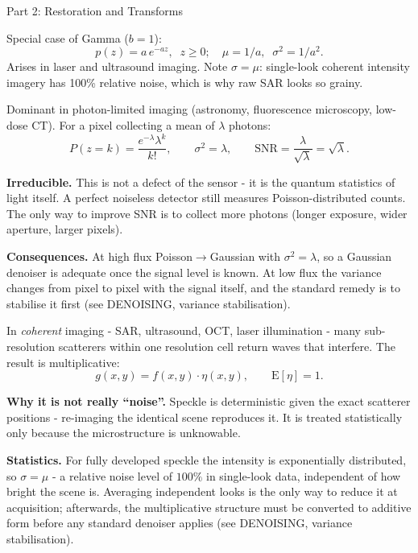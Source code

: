 \documentclass[letterpaper]{article}
\begin{document}
\begin{notes}{Part 2: Restoration and Transforms}

Special case of Gamma ($b=1$):
$$p(z) = a\,e^{-az},\;\;z\ge 0;\quad \mu=1/a,\;\;\sigma^2=1/a^2.$$
Arises in laser and ultrasound imaging. Note $\sigma = \mu$: single-look coherent intensity imagery has 100\% relative noise, which is why raw SAR looks so grainy.


Dominant in photon-limited imaging (astronomy, fluorescence microscopy, low-dose CT). For a pixel collecting a mean of $\lambda$ photons:
$$P(z=k)=\frac{e^{-\lambda}\lambda^k}{k!},\qquad \sigma^2 = \lambda,\qquad \mathrm{SNR}=\frac{\lambda}{\sqrt\lambda}=\sqrt{\lambda}.$$

\textbf{Irreducible.} This is not a defect of the sensor - it is the quantum statistics of light itself. A perfect noiseless detector still measures Poisson-distributed counts. The only way to improve SNR is to collect more photons (longer exposure, wider aperture, larger pixels).

\textbf{Consequences.} At high flux Poisson$\to$Gaussian with $\sigma^2=\lambda$, so a Gaussian denoiser is adequate once the signal level is known. At low flux the variance changes from pixel to pixel with the signal itself, and the standard remedy is to stabilise it first (see DENOISING, variance stabilisation).


In \emph{coherent} imaging - SAR, ultrasound, OCT, laser illumination - many sub-resolution scatterers within one resolution cell return waves that interfere. The result is multiplicative:
$$g(x,y) = f(x,y)\cdot\eta(x,y),\qquad \mathrm{E}[\eta]=1.$$

\textbf{Why it is not really ``noise''.} Speckle is deterministic given the exact scatterer positions - re-imaging the identical scene reproduces it. It is treated statistically only because the microstructure is unknowable.

\textbf{Statistics.} For fully developed speckle the intensity is exponentially distributed, so $\sigma=\mu$ - a relative noise level of $100\%$ in single-look data, independent of how bright the scene is. Averaging independent looks is the only way to reduce it at acquisition; afterwards, the multiplicative structure must be converted to additive form before any standard denoiser applies (see DENOISING, variance stabilisation).



\end{notes}
\end{document}
